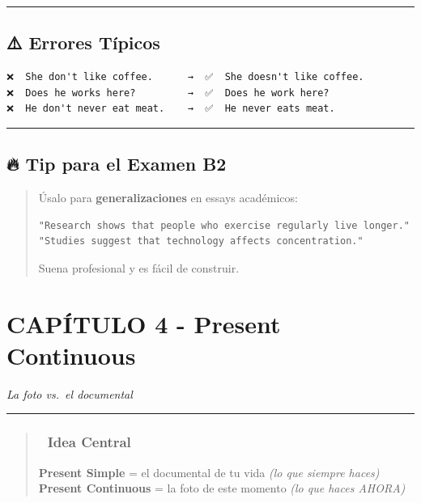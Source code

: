 \documentclass[
  spanish,
  letterpaper,
]{scrbook}
\begin{document}
\begin{center}\rule{0.5\linewidth}{0.5pt}\end{center}

\section{⚠️ Errores Típicos}\label{errores-tuxedpicos-1}

\begin{verbatim}
❌  She don't like coffee.      →  ✅  She doesn't like coffee.
❌  Does he works here?         →  ✅  Does he work here?
❌  He don't never eat meat.    →  ✅  He never eats meat.
\end{verbatim}

\begin{center}\rule{0.5\linewidth}{0.5pt}\end{center}

\section{🔥 Tip para el Examen B2}\label{tip-para-el-examen-b2}

\begin{quote}
Úsalo para \textbf{generalizaciones} en essays académicos:

\begin{verbatim}
"Research shows that people who exercise regularly live longer."
"Studies suggest that technology affects concentration."
\end{verbatim}

Suena profesional y es fácil de construir.
\end{quote}

\chapter{CAPÍTULO 4 - Present
Continuous}\label{capuxedtulo-4---present-continuous}

\emph{La foto vs.~el documental}

\begin{center}\rule{0.5\linewidth}{0.5pt}\end{center}

\begin{quote}
\subsection{🎯 Idea Central}\label{idea-central-2}

\textbf{Present Simple} = el documental de tu vida \emph{(lo que siempre
haces)} \textbf{Present Continuous} = la foto de este momento \emph{(lo
que haces AHORA)}
\end{quote}
\end{document}
